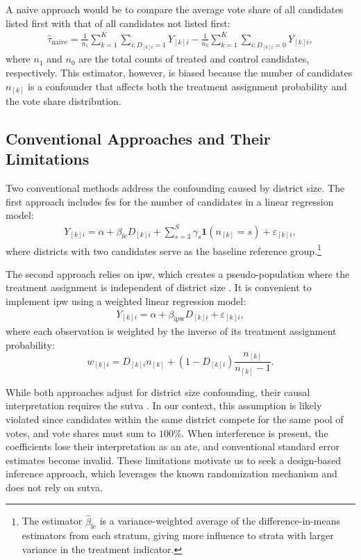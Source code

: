 \documentclass[10pt]{article}
\theoremstyle{sfstyle}
\theoremstyle{remark}
\begin{document}
A naive approach would be to compare 
the average vote share of all candidates listed first 
with that of all candidates not listed first:
\begin{align}
\hat{\tau}_{\text{naive}}
= \frac{1}{n_1} \sum_{k=1}^K \sum_{i: D_{[k]i} = 1} Y_{[k]i}
 - \frac{1}{n_0} \sum_{k=1}^K \sum_{i: D_{[k]i} = 0} Y_{[k]i},
 \label{eq:naive-estimator}
\end{align}
where $n_1$ and $n_0$ are the total counts of treated and control candidates, respectively.
This estimator,
however,
is biased because the number of candidates $n_{[k]}$
is a confounder that
affects both the treatment assignment probability
and the vote share distribution.

\subsection{Conventional Approaches and Their Limitations}

Two conventional methods address the confounding caused by district size.
The first approach includes \glspl{fe}
for the number of candidates in a linear regression model:
\begin{align}
  Y_{[k]i} = \alpha + \beta_{\text{fe}} D_{[k]i} +
  \sum_{s=3}^{S} \gamma_s \mathbf{1}(n_{[k]} = s) + \varepsilon_{[k]i},
  \label{eq:fixed-effects-model}
\end{align}
where districts with two candidates serve as the baseline reference group.\footnote{
  The estimator $\hat{\beta}_{\text{fe}}$ is a variance-weighted average of the
  difference-in-means estimators from each stratum, 
  giving more influence to strata 
  with larger variance in the treatment indicator.
}

The second approach relies on \gls{ipw},
which creates a pseudo-population
where the treatment assignment is independent of district size
\citep{horvitz1952generalization, hernan2020causal}.
It is convenient to implement \gls{ipw}
using a weighted linear regression model:
\begin{align}
  Y_{[k]i} = \alpha + \beta_{\text{ipw}} D_{[k]i} + \varepsilon_{[k]i},
  \label{eq:ipw-model}
\end{align}
where each observation is weighted by the inverse of its treatment assignment probability:
$$
w_{[k]i} = D_{[k]i} n_{[k]} + (1 - D_{[k]i}) \frac{n_{[k]}}{n_{[k]} - 1}.
$$

While both approaches adjust for district size confounding,
their causal interpretation requires the \gls{sutva}
\citep{cox1958planning, rubin1980discussion}.
In our context,
this assumption is likely violated
since candidates within the same district
compete for the same pool of votes,
and vote shares must sum to $100\%$.
When interference is present,
the coefficients lose their interpretation
as an \gls{ate},
and conventional standard error estimates
become invalid.
These limitations motivate us to seek
a design-based inference approach,
which leverages the known randomization mechanism
and does not rely on \gls{sutva}.
\end{document}
